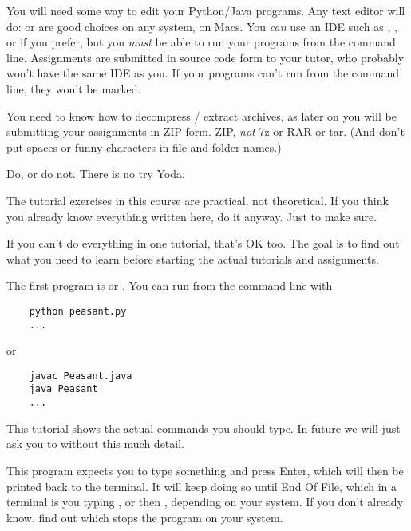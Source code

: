 You will need some way to edit your Python/Java programs. Any text editor will do:
 or  are good choices on any system,  on
Macs. You \emph{can} use an IDE such as , , or 
if you prefer, but you \emph{must} be able to run your programs from the command line.
Assignments are submitted in source code form to your tutor, who probably won't have
the same IDE as you. If your programs can't run from the command line, they won't be
marked.

You need to know how to decompress / extract  archives, as later on you will
be submitting your assignments in ZIP form. ZIP, \emph{not} 7z or RAR or tar.
(And don't put spaces or funny characters in file and folder names.)



\begin{IMPORTANT}
Do, or do not. There is no try \DSH Yoda.

The tutorial exercises in this course are practical, not theoretical. If you think
you already know everything written here, do it anyway. Just to make sure.

If you can't do everything in one tutorial, that's OK too. The goal is to find
out what you need to learn before starting the actual tutorials and assignments.
\end{IMPORTANT}

The first program is  or . You can run from the
command line with
\begin{CODE}\begin{verbatim}
    python peasant.py
    ...
\end{verbatim}\end{CODE}
or
\begin{CODE}\begin{verbatim}
    javac Peasant.java
    java Peasant
    ...
\end{verbatim}\end{CODE}

\begin{IMPORTANT}
This tutorial shows the actual commands you should type. In future we will just ask you
to  without this much detail.
\end{IMPORTANT}

This program expects you to type something and press Enter, which will then be printed
back to the terminal. It will keep doing so until End Of File, which in a terminal is
you typing , or  then , depending on your system.
If you don't already know, find out which stops the program on your system.

